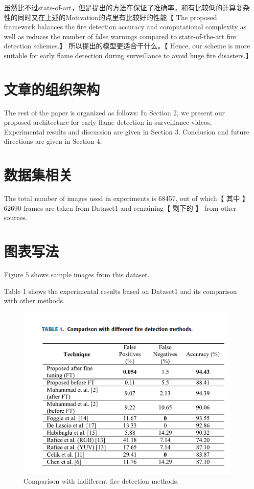 \documentclass[UTF8]{ctexart}
\begin{document}
		虽然比不过state-of-art，但是提出的方法在保证了准确率，和有比较低的计算复杂性的同时又在上述的Motivation的点里有比较好的性能【 The proposed framework balances the fire detection accuracy
		and computational complexity as well as reduces the
		number of false warnings compared to state-of-the-art fire
		detection schemes.】 所以提出的模型更适合干什么。【 Hence, our scheme is more suitable for
		early flame detection during surveillance to avoid huge
		fire disasters.】
		
		\section{文章的组织架构}
		The rest of the paper is organized as follows: In Section 2,
		we present our proposed architecture for early flame detection
		in surveillance videos. Experimental results and discussion
		are given in Section 3. Conclusion and future directions
		are given in Section 4.
		
		
		\section{数据集相关}
		The total
		number of images used in experiments is 68457, out of
		which【 其中 】 62690   frames are taken from Dataset1 and remaining【 剩下的 】
		from other sources.
		
		\section{图表写法}
		Figure 5 shows sample images from this dataset. 
		
		Table 1 shows the experimental results based on Dataset1 and its
		comparison with other methods.
		
		\begin{figure}
			\centering
			\includegraphics[width=0.7\linewidth]{comparison.png}
			\caption{Comparison with indifferent fire detection methods.}
			\label{fig:}
		\end{figure}
	
\end{document}
